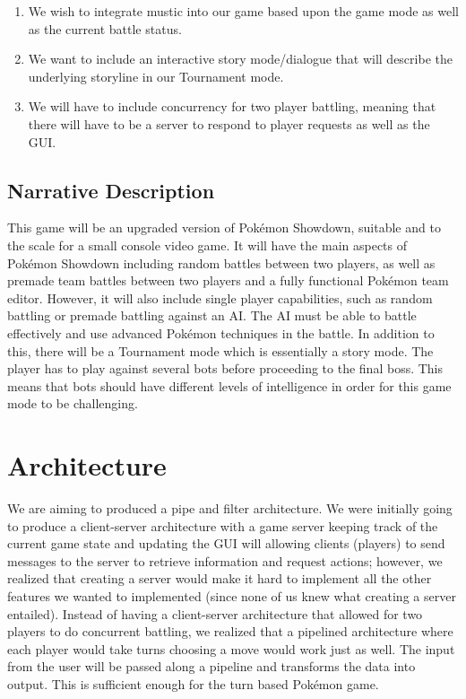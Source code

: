 \documentclass{scrreprt}
\begin{document}
\begin{enumerate}
	\item We wish to integrate mustic into our game based upon the game mode as well as the current battle status.
	\item We want to include an interactive story mode/dialogue that will describe the underlying storyline in our Tournament mode. 
	\item We will have to include concurrency for two player battling, meaning that there will have to be a server to respond to player requests as well as the GUI. 
\end{enumerate}

\subsection{Narrative Description}
	This game will be an upgraded version of Pok\'emon Showdown, suitable and to the scale for a small console video game. It will have the main aspects of Pok\'emon Showdown including random battles between two players, as well as premade team battles between two players and a fully functional Pok\'emon team editor. However, it will also include single player capabilities, such as random battling or premade battling against an AI. The AI must be able to battle effectively and use advanced Pok\'emon techniques in the battle. In addition to this, there will be a Tournament mode which is essentially a story mode. The player has to play against several bots before proceeding to the final boss. This means that bots should have different levels of intelligence in order for this game mode to be challenging. 
\section{Architecture}
	We are aiming to produced a pipe and filter architecture. We were initially going to produce a client-server architecture with a game server keeping track of the current game state and updating the GUI will allowing clients (players) to send messages to the server to retrieve information and request actions; however, we realized that creating a server would make it hard to implement all the other features we wanted to implemented (since none of us knew what creating a server entailed). Instead of having a client-server architecture that allowed for two players to do concurrent battling, we realized that a pipelined architecture where each player would take turns choosing a move would work just as well. The input from the user will be passed along a pipeline and transforms the data into output. This is sufficient enough for the turn based Pok\'emon game. 
	
\end{document}
